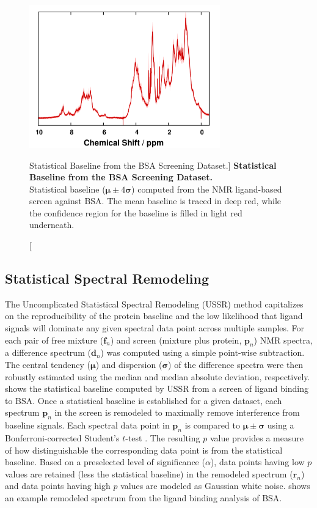 \begin{figure}
\includegraphics[width=3.25in]{figs/ussr/01-baseline.png}
\caption
      [Statistical Baseline from the BSA Screening Dataset.]{
  {\bf Statistical Baseline from the BSA Screening Dataset.}
  \\
  Statistical baseline ($\boldsymbol{\mu} \pm 4 \boldsymbol{\sigma}$) computed
  from the \hnmr{} NMR ligand-based screen against BSA. The mean baseline is
  traced in deep red, while the confidence region for the baseline is filled
  in light red underneath.
}
\label{figure.7.1}
\end{figure}

\subsection{Statistical Spectral Remodeling}

\begin{doublespace}
The Uncomplicated Statistical Spectral Remodeling (USSR) method capitalizes on
the reproducibility of the protein baseline and the low likelihood that ligand
signals will dominate any given spectral data point across multiple samples.
For each pair of free mixture ($\mathbf{f}_n$) and screen (mixture plus
protein, $\mathbf{p}_n$) \hnmr{} NMR spectra, a difference spectrum
($\mathbf{d}_n$) was computed using a simple point-wise subtraction. The
central tendency ($\boldsymbol{\mu}$) and dispersion ($\boldsymbol{\sigma}$)
of the difference spectra were then robustly estimated using the median and
median absolute deviation, respectively.  shows the
statistical baseline computed by USSR from a screen of ligand binding to BSA.
Once a statistical baseline is established for a given dataset, each spectrum
$\mathbf{p}_n$ in the screen is remodeled to maximally remove interference
from baseline signals. Each spectral data point in $\mathbf{p}_n$ is compared
to $\boldsymbol{\mu} \pm \boldsymbol{\sigma}$ using a Bonferroni-corrected
Student's $t$-test \cite{dunn:jasa1961}. The resulting $p$ value provides a
measure of how distinguishable the corresponding data point is from the
statistical baseline. Based on a preselected level of significance ($\alpha$),
data points having low $p$ values are retained (less the statistical baseline)
in the remodeled spectrum ($\mathbf{r}_n$) and data points having high $p$
values are modeled as Gaussian white noise.  shows
an example remodeled spectrum from the ligand binding analysis of BSA.
\end{doublespace}

